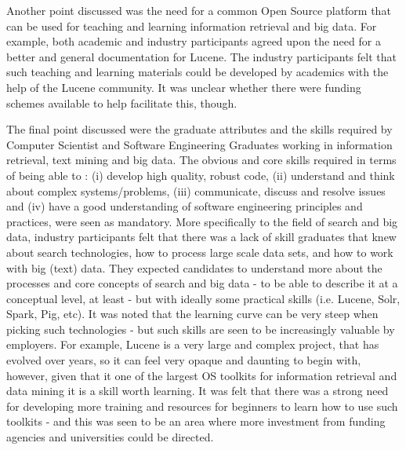 Another point discussed was the need for a common Open Source platform that can be used for teaching and learning information retrieval and big data. 
For example, both academic and industry participants agreed upon the need for a better and general documentation for Lucene. The industry participants felt that such teaching and learning materials could be developed by academics with the help of the Lucene community. It was unclear whether there were funding schemes available to help facilitate this, though.


The final point discussed were the graduate attributes and the skills required by Computer Scientist and Software Engineering Graduates working in information retrieval, text mining and big data. 
The obvious and core skills required in terms of being able to : (i) develop high quality, robust code, (ii) understand and think about complex systems/problems, (iii) communicate, discuss and resolve issues and (iv) have a good understanding of software engineering principles and practices, were seen as mandatory. 
More specifically to the field of search and big data, industry participants felt that there was a lack of skill graduates that knew about search technologies, how to process large scale data sets, and how to work with big (text) data. 
They expected candidates to understand more about the processes and core concepts of search and big data - to be able to describe it at a conceptual level, at least - but with ideally some practical skills (i.e. Lucene, Solr, Spark, Pig, etc). 
It was noted that the learning curve can be very steep when picking such technologies - but such skills are seen to be increasingly valuable by employers. 
For example, Lucene is a very large and complex project, that has evolved over years, so it can feel very opaque and daunting to begin with, however, given that it one of the largest OS toolkits for information retrieval and data mining it is a skill worth learning. 
It was felt that there was a strong need for developing more training and resources for beginners to learn how to use such toolkits - and this was seen to be an area where more investment from funding agencies and universities could be directed. 







